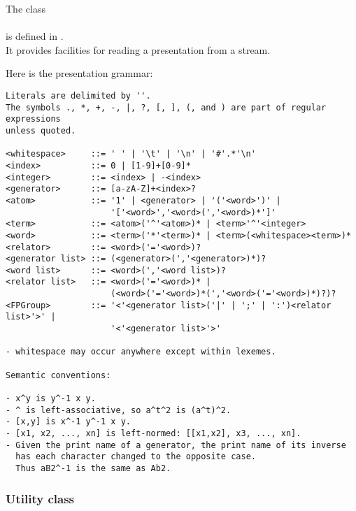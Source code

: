 
\noindent The class\\
\\
is defined in .\\
It provides facilities for reading a presentation from a stream.



\noindent Here is the presentation grammar:

\begin{verbatim}
Literals are delimited by ''.
The symbols ., *, +, -, |, ?, [, ], (, and ) are part of regular expressions
unless quoted.

<whitespace>     ::= ' ' | '\t' | '\n' | '#'.*'\n'
<index>          ::= 0 | [1-9]+[0-9]*
<integer>        ::= <index> | -<index>
<generator>      ::= [a-zA-Z]+<index>?
<atom>           ::= '1' | <generator> | '('<word>')' |
                     '['<word>','<word>(','<word>)*']'
<term>           ::= <atom>('^'<atom>)* | <term>'^'<integer>
<word>           ::= <term>('*'<term>)* | <term>(<whitespace><term>)*
<relator>        ::= <word>('='<word>)?
<generator list> ::= (<generator>(','<generator>)*)?
<word list>      ::= <word>(','<word list>)?
<relator list>   ::= <word>('='<word>)* |
                     (<word>('='<word>)*(','<word>('='<word>)*)?)?
<FPGroup>        ::= '<'<generator list>('|' | ';' | ':')<relator list>'>' |
                     '<'<generator list>'>'

- whitespace may occur anywhere except within lexemes.

Semantic conventions:

- x^y is y^-1 x y.
- ^ is left-associative, so a^t^2 is (a^t)^2.
- [x,y] is x^-1 y^-1 x y.
- [x1, x2, ..., xn] is left-normed: [[x1,x2], x3, ..., xn].
- Given the print name of a generator, the print name of its inverse
  has each character changed to the opposite case.
  Thus aB2^-1 is the same as Ab2.

\end{verbatim}



\subsubsection{Utility class }

